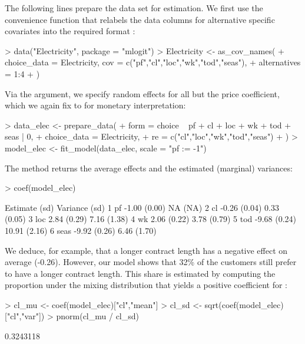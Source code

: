 \documentclass[article,shortnames]{jss}
\newcommand{\fct}[1]{\code{#1()}}
\begin{document}
The following lines prepare the data set for estimation. We first use the convenience function \fct{as\_cov\_names} that relabels the data columns for alternative specific covariates into the required format :

\begin{Schunk}
\begin{Sinput}
> data("Electricity", package = "mlogit")
> Electricity <- as_cov_names(
+    choice_data = Electricity, cov = c("pf","cl","loc","wk","tod","seas"),
+    alternatives = 1:4
+  )
\end{Sinput}
\end{Schunk}

Via the  argument, we specify random effects for all but the price coefficient, which we again fix to  for monetary interpretation:

\begin{Schunk}
\begin{Sinput}
> data_elec <- prepare_data(
+    form = choice ~ pf + cl + loc + wk + tod + seas | 0,
+    choice_data = Electricity,
+    re = c("cl","loc","wk","tod","seas")
+  )
> model_elec <- fit_model(data_elec, scale = "pf := -1")
\end{Sinput}
\end{Schunk}

The \fct{coef} method returns the average effects and the estimated (marginal) variances:

\begin{Schunk}
\begin{Sinput}
> coef(model_elec)
\end{Sinput}
\begin{Soutput}
        Estimate   (sd) Variance   (sd)
1   pf     -1.00 (0.00)       NA   (NA)
2   cl     -0.26 (0.04)     0.33 (0.05)
3  loc      2.84 (0.29)     7.16 (1.38)
4   wk      2.06 (0.22)     3.78 (0.79)
5  tod     -9.68 (0.24)    10.91 (2.16)
6 seas     -9.92 (0.26)     6.46 (1.70)
\end{Soutput}
\end{Schunk}

We deduce, for example, that a longer contract length has a negative effect on average (-0.26). However, our model shows that 32\% of the customers still prefer to have a longer contract length. This share is estimated by computing the proportion under the mixing distribution that yields a positive coefficient for :

\begin{Schunk}
\begin{Sinput}
> cl_mu <- coef(model_elec)["cl","mean"]
> cl_sd <- sqrt(coef(model_elec)["cl","var"])
> pnorm(cl_mu / cl_sd)
\end{Sinput}
\begin{Soutput}
[1] 0.3243118
\end{Soutput}
\end{Schunk}
\end{document}
